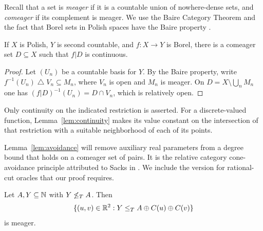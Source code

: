 Recall that a set is \emph{meager} if it is a countable union of
nowhere-dense sets, and \emph{comeager} if its complement is
meager. We use the Baire Category Theorem and the fact that Borel
sets in Polish spaces have the Baire property
\cite[Theorem~2.52 and Corollary~2.57]{MarkerDST}.

\begin{lemma}\label{lem:continuity}
If $X$ is Polish, $Y$ is second countable, and $f:X\to Y$ is
Borel, there is a comeager set $D\subseteq X$ such that $f|D$
is continuous.
\end{lemma}

\begin{proof}
Let $(U_n)$ be a countable basis for $Y$. By the Baire property,
write $f^{-1}(U_n)\mathbin{\triangle}V_n\subseteq M_n$, where
$V_n$ is open and $M_n$ is meager. On
$D=X\setminus\bigcup_nM_n$ one has
$(f|D)^{-1}(U_n)=D\cap V_n$, which is relatively open.
\end{proof}

Only continuity on the indicated restriction is asserted.
For a discrete-valued function, Lemma~\ref{lem:continuity}
makes its value constant on the intersection of that restriction
with a suitable neighborhood of each of its points.

Lemma~\ref{lem:avoidance} will remove auxiliary real parameters from
a degree bound that holds on a comeager set of pairs.
It is the relative category cone-avoidance principle attributed
to Sacks in \cite[Lemma~4.1]{KumarShelah2023}. We include the version for
rational-cut oracles that our proof requires.

\begin{lemma}\label{lem:avoidance}
Let $A,Y\subseteq\mathbb N$ with $Y\not\le_T A$. Then
\[
\{(u,v)\in\mathbb R^2:Y\le_T A\oplus C(u)\oplus C(v)\}
\]
is meager.
\end{lemma}

